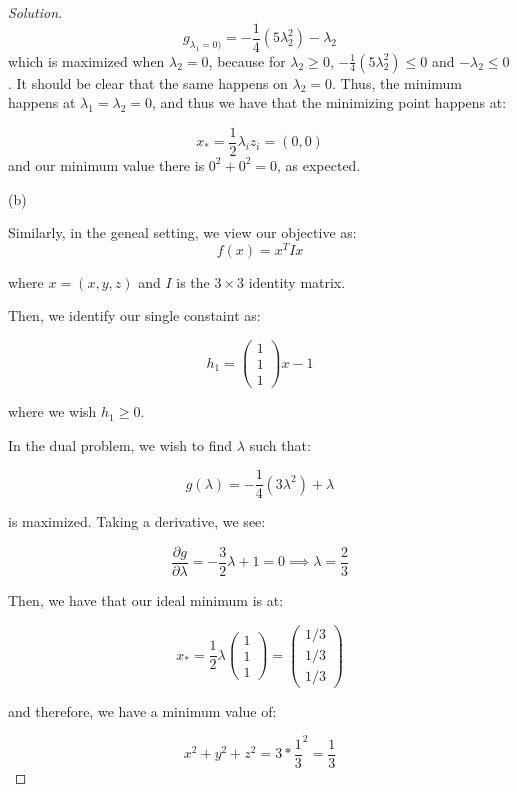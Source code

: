 \documentclass[10pt]{article}
\begin{document}
\begin{proof}[Solution]
$$g_{\lambda_1 = 0)} =  -\frac{1}{4} (5 \lambda_2^2 ) - \lambda_2$$ which is maximized when $\lambda_2 = 0$, because for $\lambda_2 \geq 0$, $ -\frac{1}{4} (5 \lambda_2^2 )  \leq 0$ and $-\lambda_2 \leq 0$. It should be clear that the same happens on $\lambda_2 = 0$. Thus, the minimum happens at $\lambda_1 = \lambda_2 = 0$, and thus we have that the minimizing point happens at:

$$ x_* = \frac{1}{2} \lambda_i z_i = (0,0) $$ and our minimum value there is $0^2 + 0^2 = 0$, as expected.

(b)

Similarly, in the geneal setting, we view our objective as: $$f(x) = x^T I x$$

where $x = (x,y,z)$ and $I$ is the $3 \times 3$ identity matrix.

Then, we identify our single constaint as:

$$ h_1 =  \begin{pmatrix} 1 \\ 1 \\ 1 \end{pmatrix}x - 1$$

where we wish $h_1 \geq 0$.

In the dual problem, we wish to find $\lambda$ such that:

$$ g(\lambda) = -\frac{1}{4} (3 \lambda^2) + \lambda$$

is maximized. Taking a derivative, we see:

$$\frac{\partial g}{\partial \lambda} = -\frac{3}{2} \lambda + 1 = 0 \implies \lambda = \frac{2}{3} $$

Then, we have that our ideal minimum is at:

$$ x_* = \frac{1}{2} \lambda   \begin{pmatrix} 1 \\ 1 \\ 1 \end{pmatrix} =  \begin{pmatrix} 1/3 \\ 1/3 \\ 1/3 \end{pmatrix}$$

and therefore, we have a minimum value of:

$$x^2 + y^2 + z^2 =  3 * \frac{1}{3}^2 = \frac{1}{3} $$

\end{proof}
\end{document}
